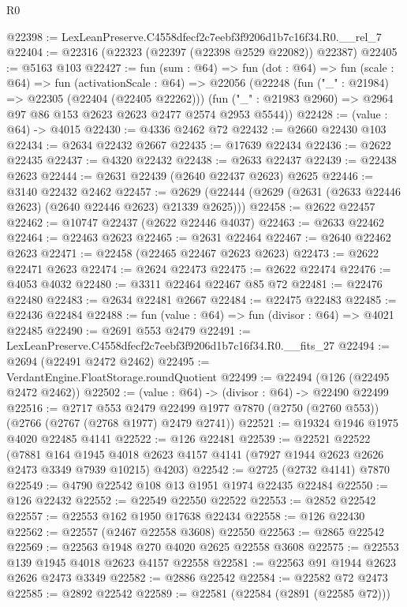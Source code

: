 \begin{lexlean}{R0}
\begin{coremodule}
@22398 := LexLeanPreserve.C4558dfecf2c7eebf3f9206d1b7c16f34.R0.__rel_7
@22404 := @22316 (@22323 (@22397 (@22398 @2529 @22082)) @22387)
@22405 := @5163 @103
@22427 := fun (sum : @64) =>
  fun (dot : @64) =>
  fun (scale : @64) =>
  fun (activationScale : @64) =>
  @22056
    (@22248
      (fun ("_" : @21984) => @22305 (@22404 (@22405 @22262)))
      (fun ("_" : @21983 @2960) => @2964 @97 @86 @153 @2623 @2623 @2477 @2574 @2953 @5544))
@22428 := (value : @64) -> @4015
@22430 := @4336 @2462 @72
@22432 := @2660 @22430 @103
@22434 := @2634 @22432 @2667
@22435 := @17639 @22434
@22436 := @2622 @22435
@22437 := @4320 @22432
@22438 := @2633 @22437
@22439 := @22438 @2623
@22444 := @2631 @22439 (@2640 @22437 @2623) @2625
@22446 := @3140 @22432 @2462
@22457 := @2629 (@22444 (@2629 (@2631 (@2633 @22446 @2623) (@2640 @22446 @2623) @21339 @2625)))
@22458 := @2622 @22457
@22462 := @10747 @22437 (@2622 @22446 @4037)
@22463 := @2633 @22462
@22464 := @22463 @2623
@22465 := @2631 @22464
@22467 := @2640 @22462 @2623
@22471 := @22458 (@22465 @22467 @2623 @2623)
@22473 := @2622 @22471 @2623
@22474 := @2624 @22473
@22475 := @2622 @22474
@22476 := @4053 @4032
@22480 := @3311 @22464 @22467 @85 @72
@22481 := @22476 @22480
@22483 := @2634 @22481 @2667
@22484 := @22475 @22483
@22485 := @22436 @22484
@22488 := fun (value : @64) => fun (divisor : @64) => @4021 @22485
@22490 := @2691 @553 @2479
@22491 := LexLeanPreserve.C4558dfecf2c7eebf3f9206d1b7c16f34.R0.__fits_27
@22494 := @2694 (@22491 @2472 @2462)
@22495 := VerdantEngine.FloatStorage.roundQuotient
@22499 := @22494 (@126 (@22495 @2472 @2462))
@22502 := (value : @64) -> (divisor : @64) -> @22490 @22499
@22516 := @2717
    @553
    @2479
    @22499
    @1977
    @7870
    (@2750 (@2760 @553))
    (@2766 (@2767 (@2768 @1977) @2479 @2741))
@22521 := @19324 @1946 @1975 @4020 @22485 @4141
@22522 := @126 @22481
@22539 := @22521
    @22522
    (@7881
      @164
      @1945
      @4018
      @2623
      @4157
      @4141
      (@7927 @1944 @2623 @2626 @2473 @3349 @7939 @10215)
      @4203)
@22542 := @2725 (@2732 @4141) @7870
@22549 := @4790 @22542 @108 @13 @1951 @1974 @22435 @22484
@22550 := @126 @22432
@22552 := @22549 @22550 @22522
@22553 := @2852 @22542
@22557 := @22553 @162 @1950 @17638 @22434
@22558 := @126 @22430
@22562 := @22557 (@2467 @22558 @3608) @22550
@22563 := @2865 @22542
@22569 := @22563 @1948 @270 @4020 @2625 @22558 @3608
@22575 := @22553 @139 @1945 @4018 @2623 @4157 @22558
@22581 := @22563 @91 @1944 @2623 @2626 @2473 @3349
@22582 := @2886 @22542
@22584 := @22582 @72 @2473
@22585 := @2892 @22542
@22589 := @22581 (@22584 (@2891 (@22585 @72)))

\end{coremodule}
\end{lexlean}

